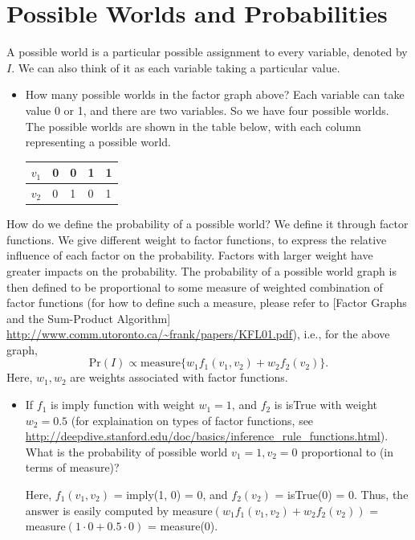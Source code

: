 \documentclass[11pt]{article}
\begin{document}
\section{Possible Worlds and Probabilities}
A possible world is a particular possible assignment to every variable, denoted by $I$. We can also think of it as each variable taking a particular value.
\begin{itemize}
\item How many possible worlds in the factor graph above? Each variable can take value 0 or 1, and there are two variables. So we have four possible worlds. The possible worlds are shown in the table below, with each column representing a possible world.
    \begin{center}
    \begin{tabular}{|l|llll|}
      \hline
      $v_1$ & 0 & 0 & 1 & 1\\
      \hline
      $v_2$ & 0 & 1 & 0 & 1\\
      \hline
    \end{tabular}
    \end{center}
\end{itemize}
How do we define the probability of a possible world? We define it through factor functions. We give different weight to factor functions, to express the relative influence of each factor on the probability. Factors with larger weight have greater impacts on the probability. The probability of a possible world graph is then defined to be proportional to some measure of weighted combination of factor functions (for how to define such a measure, please refer to [Factor Graphs and the Sum-Product Algorithm] \url{http://www.comm.utoronto.ca/~frank/papers/KFL01.pdf}), i.e., for the above graph,
\[ \text{Pr}(I) \propto \text{measure}\{w_1 f_1(v_1, v_2) + w_2 f_2(v_2)\}. \]
Here, $w_1, w_2$ are weights associated with factor functions.
\begin{itemize}
\item If $f_1$ is imply function with weight $w_1 = 1$, and $f_2$ is isTrue with weight $w_2 = 0.5$ (for explaination on types of factor functions, see \url{http://deepdive.stanford.edu/doc/basics/inference_rule_functions.html}). What is the probability of possible world $v_1 = 1, v_2 = 0$ proportional to (in terms of measure)?

    Here, $f_1(v_1, v_2)$ = imply(1, 0) = 0, and $f_2(v_2)$ = isTrue(0) = 0. Thus, the answer is easily computed by measure$(w_1 f_1(v_1, v_2) + w_2 f_2(v_2))$ = measure$(1 \cdot 0 + 0.5 \cdot 0)$ = measure(0).
\end{itemize}
\end{document}
